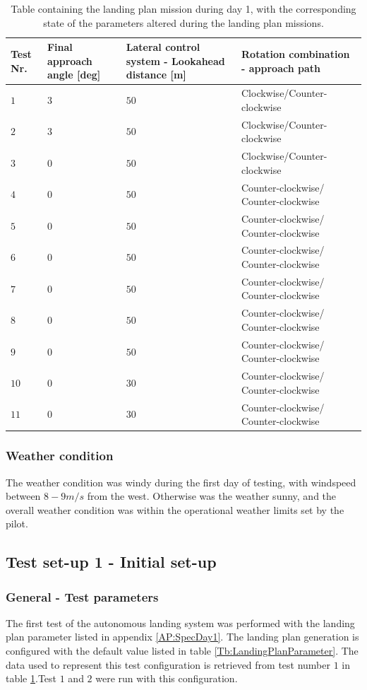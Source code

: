 \begin{table}[H]
\begin{tabular}{| p{0.5cm} | p{3cm} | p{4cm} | p{4cm} |}
\hline
\textbf{Test Nr.} & \textbf{Final approach angle [deg]} & \textbf{Lateral control system - Lookahead distance [m]} &  \textbf{Rotation combination - approach path}\\ \hline
$1$				& $3$ &	$ 50 $ 	& Clockwise/Counter-clockwise		\\ \hline
$2$				& $3$ & $ 50 $	& Clockwise/Counter-clockwise			\\ \hline
$3$				& $0$ & $ 50 $	& Clockwise/Counter-clockwise		\\ \hline
$4$				& $0$ & $ 50 $ 	& Counter-clockwise/ Counter-clockwise				\\ \hline
$5$				& $0$ & $ 50 $ & Counter-clockwise/ Counter-clockwise					\\ \hline
$6$				& $0$ & $ 50 $	& Counter-clockwise/ Counter-clockwise				\\ \hline
$7$				& $0$ &	$ 50 $ & Counter-clockwise/ Counter-clockwise				\\ \hline
$8$				& $0$ & $ 50 $	& Counter-clockwise/ Counter-clockwise				\\ \hline
$9$				& $0$ & $ 50 $ & Counter-clockwise/ Counter-clockwise			\\ \hline
$10$			& $0$ &	$ 30 $ & Counter-clockwise/ Counter-clockwise	\\ \hline
$11$			& $0$ & $ 30 $ & Counter-clockwise/ Counter-clockwise\\ \hline
\end{tabular}
\caption{Table containing the landing plan mission during day 1, with the corresponding state of the parameters altered during the landing plan missions.}
\label{tb:Day1ParameterAlteration}
\end{table}
\subsubsection{Weather condition}
The weather condition was windy during the first day of testing, with windspeed between $8-9 m/s$ from the west. Otherwise was the weather sunny, and the overall weather condition was within the operational weather limits set by the pilot.
\subsection{Test set-up 1 - Initial set-up}\label{ss:TestSetup1}
\subsubsection{General - Test parameters}\label{ss:TestParaInitiDay1}
The first test of the autonomous landing system was performed with the landing plan parameter listed in appendix \ref{AP:SpecDay1}. The landing plan generation is configured with the default value listed in table \ref{Tb:LandingPlanParameter}. The data used to represent this test configuration is retrieved from test number $1$ in table \ref{tb:Day1ParameterAlteration}.Test $1$ and $2$ were run with this configuration.
